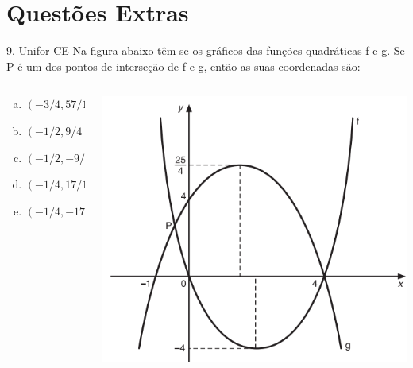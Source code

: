 \documentclass[11pt]{beamer}
\begin{document}
\section{Questões Extras}
\begin{frame}{9. Unifor-CE}
    Na figura abaixo têm-se os gráficos das funções quadráticas f e g. Se P é um dos pontos de interseção de f e g, então as suas coordenadas são:

    \begin{columns}
        \begin{column}{0.4\textwidth}
            \begin{enumerate}[a)]
                \item $(-{3}/{4},{57}/{16})$ 
                \item $(-{1}/{2},{9}/{4})$  %
                \item $(-{1}/{2},-{9}/{4})$
                \item $(-{1}/{4},{17}/{16})$ 
                \item $(-{1}/{4},-{17}/{16})$
            \end{enumerate}
        \end{column}

        \begin{column}{0.6\textwidth}
            \centering
            \includegraphics[width=0.9\linewidth]{imagens/Unifor-CE.png}
        \end{column}
    \end{columns}
    
\end{frame}
\end{document}

